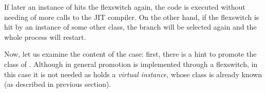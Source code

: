 If later an instance of  hits the flexswitch again, the
code is executed without needing of more calls to the JIT compiler.  On the
other hand, if the flexswitch is hit by an instance of some other class, the
 branch will be selected again and the whole process will
restart.

Now, let us examine the content of the  case: first, there
is a hint to promote the class of .  Although in general
promotion is implemented through a flexswitch, in this case it is not needed
as  holds a \emph{virtual instance}, whose class is already
known (as described in previous section).


